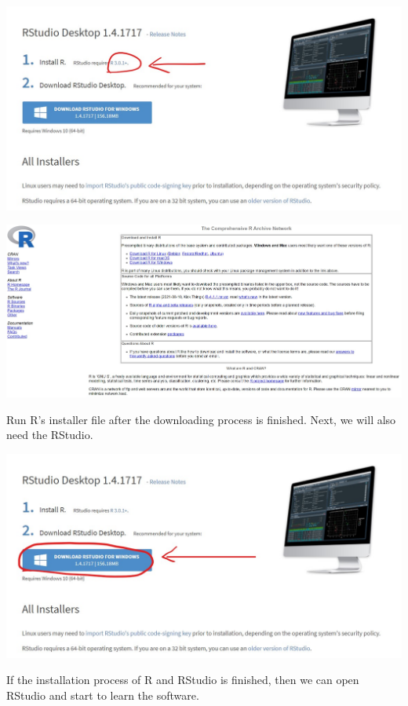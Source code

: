 \documentclass[
]{article}
\begin{document}
\href{https://www.rstudio.com/products/rstudio/download/\#download}{\includegraphics[width=6.25in,height=\textheight]{images/installr.jpg}}

\href{https://cran.rstudio.com/}{\includegraphics[width=6.25in,height=\textheight]{images/installr2.jpg}}

Run R's installer file after the downloading process is finished.
Next, we will also need the RStudio.

\href{https://www.rstudio.com/products/rstudio/download/\#download}{\includegraphics[width=6.25in,height=\textheight]{images/installr3.jpg}}

If the installation process of R and RStudio is finished, then we can open RStudio and start to learn the software.

  
\end{document}
